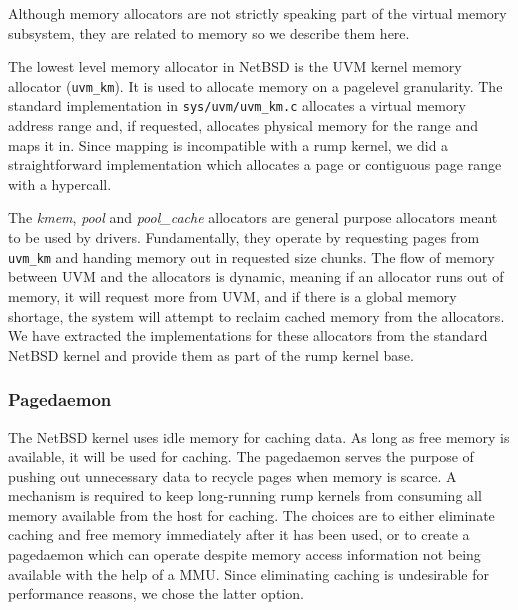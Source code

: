 Although memory allocators are not strictly speaking part of the
virtual memory subsystem, they are related to memory so we describe
them here.

The lowest level memory allocator in NetBSD is the UVM kernel memory
allocator (\verb+uvm_km+).  It is used to allocate memory on a
pagelevel granularity.  The standard implementation in
\verb+sys/uvm/uvm_km.c+ allocates a virtual memory address range
and, if requested, allocates physical memory for the range and maps
it in.  Since mapping is incompatible with a rump kernel, we did
a straightforward implementation which allocates a page or contiguous
page range with a hypercall.

The \textit{kmem}, \textit{pool} and \textit{pool\_cache} allocators
are general purpose allocators meant to be used by drivers.
Fundamentally, they operate by requesting pages from \verb+uvm_km+
and handing memory out in requested size chunks.  The flow of memory between
UVM and the allocators is dynamic, meaning if an allocator runs
out of memory, it will request more from UVM, and if there is a
global memory shortage, the system will attempt to reclaim cached
memory from the allocators.  We have extracted the implementations
for these allocators from the standard NetBSD kernel and provide
them as part of the rump kernel base.

\subsubsection{Pagedaemon}

The NetBSD kernel uses idle memory for caching data.  As long as
free memory is available, it will be used for caching.  The pagedaemon
serves the purpose of pushing out unnecessary data to recycle pages
when memory is scarce.  A mechanism is required to keep long-running
rump kernels from consuming all memory available from the host for
caching.  The choices are to either eliminate caching and free
memory immediately after it has been used, or to create a pagedaemon
which can operate despite memory access information not being
available with the help of a MMU.  Since eliminating caching is
undesirable for performance reasons, we chose the latter option.

